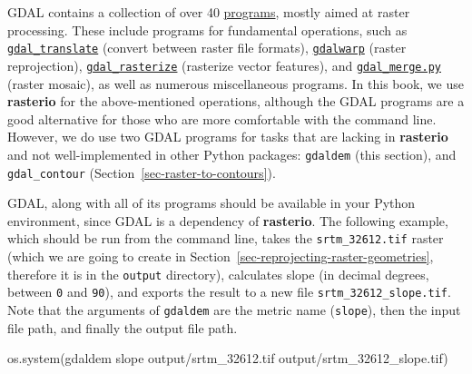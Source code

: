 \documentclass[
  letterpaper,
]{krantz}
\newenvironment{Shaded}{\begin{snugshade}}{\end{snugshade}}
\newcommand{\NormalTok}[1]{\textcolor[rgb]{0.00,0.23,0.31}{#1}}
\newcommand{\StringTok}[1]{\textcolor[rgb]{0.13,0.47,0.30}{#1}}
\begin{document}
\begin{tcolorbox}[enhanced jigsaw, title=\textcolor{quarto-callout-note-color}{\faInfo}\hspace{0.5em}{Note}, coltitle=black, colbacktitle=quarto-callout-note-color!10!white, breakable, titlerule=0mm, colframe=quarto-callout-note-color-frame, opacitybacktitle=0.6, colback=white, bottomrule=.15mm, left=2mm, leftrule=.75mm, toprule=.15mm, toptitle=1mm, bottomtitle=1mm, arc=.35mm, opacityback=0, rightrule=.15mm]

GDAL contains a collection of over 40
\href{https://gdal.org/programs/index.html}{programs}, mostly aimed at
raster processing. These include programs for fundamental operations,
such as
\href{https://gdal.org/programs/gdal_translate.html\#gdal-translate}{\texttt{gdal\_translate}}
(convert between raster file formats),
\href{https://gdal.org/programs/gdalwarp.html\#gdalwarp}{\texttt{gdalwarp}}
(raster reprojection),
\href{https://gdal.org/programs/gdal_rasterize.html\#gdal-rasterize}{\texttt{gdal\_rasterize}}
(rasterize vector features), and
\href{https://gdal.org/programs/gdal_merge.html\#gdal-merge}{\texttt{gdal\_merge.py}}
(raster mosaic), as well as numerous miscellaneous programs. In this
book, we use \textbf{rasterio} for the above-mentioned operations,
although the GDAL programs are a good alternative for those who are more
comfortable with the command line. However, we do use two GDAL programs
for tasks that are lacking in \textbf{rasterio} and not well-implemented
in other Python packages: \texttt{gdaldem} (this section), and
\texttt{gdal\_contour} (Section~\ref{sec-raster-to-contours}).

\end{tcolorbox}

GDAL, along with all of its programs should be available in your Python
environment, since GDAL is a dependency of \textbf{rasterio}. The
following example, which should be run from the command line, takes the
\texttt{srtm\_32612.tif} raster (which we are going to create in
Section~\ref{sec-reprojecting-raster-geometries}, therefore it is in the
\texttt{\textquotesingle{}output\textquotesingle{}} directory),
calculates slope (in decimal degrees, between \texttt{0} and
\texttt{90}), and exports the result to a new file
\texttt{srtm\_32612\_slope.tif}. Note that the arguments of
\texttt{gdaldem} are the metric name (\texttt{slope}), then the input
file path, and finally the output file path.

\begin{Shaded}
\begin{Highlighting}[]
\NormalTok{os.system(}\StringTok{\textquotesingle{}gdaldem slope output/srtm\_32612.tif output/srtm\_32612\_slope.tif\textquotesingle{}}\NormalTok{)}
\end{Highlighting}
\end{Shaded}
\end{document}

